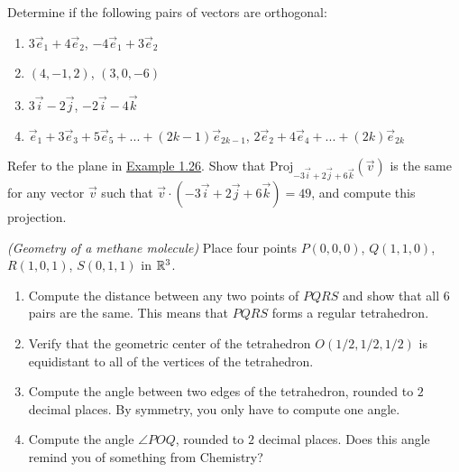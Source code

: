 \begin{exerciselist}
	\item Determine if the following pairs of vectors are orthogonal: \begin{enumerate}[label=(\alph*)]
		\item $3\vec{e}_1+4\vec{e}_2$, $-4\vec{e}_1+3\vec{e}_2$
		\item $(4,-1,2)$, $(3,0,-6)$
		\item $3\vec{i}-2\vec{j}$, $-2\vec{i}-4\vec{k}$
		\item $\vec{e}_1 + 3\vec{e}_3 + 5\vec{e}_5+ ...+(2k-1)\vec{e}_{2k-1}$, $2\vec{e}_2+4\vec{e}_4+...+(2k)\vec{e}_{2k}$
	\end{enumerate}
	\item Refer to the plane in \hyperref[ex:1.26]{Example 1.26}. Show that $\textrm{Proj}_{-3\vec{i}+2\vec{j}+6\vec{k}}(\vec{v})$ is the same for any vector $\vec{v}$ such that $\vec{v}\cdot(-3\vec{i}+2\vec{j}+6\vec{k}) =49$, and compute this projection.
	\item \textit{(Geometry of a methane molecule)} Place four points $P(0,0,0)$, $Q(1,1,0)$, $R(1,0,1)$, $S(0,1,1)$ in $\mathbb{R}^3$. \begin{enumerate}[label=(\alph*)]
		\item Compute the distance between any two points of $PQRS$ and show that all $6$ pairs are the same. This means that $PQRS$ forms a regular tetrahedron.
		\item  Verify that the geometric center of the tetrahedron $O(1/2, 1/2, 1/2)$ is equidistant to all of the vertices of the tetrahedron.
		\item Compute the angle between two edges of the tetrahedron, rounded to $2$ decimal places. By symmetry, you only have to compute one angle.
		\item Compute the angle $\angle POQ$, rounded to $2$ decimal places. Does this angle remind you of something from Chemistry?
	\end{enumerate}
\end{exerciselist}
